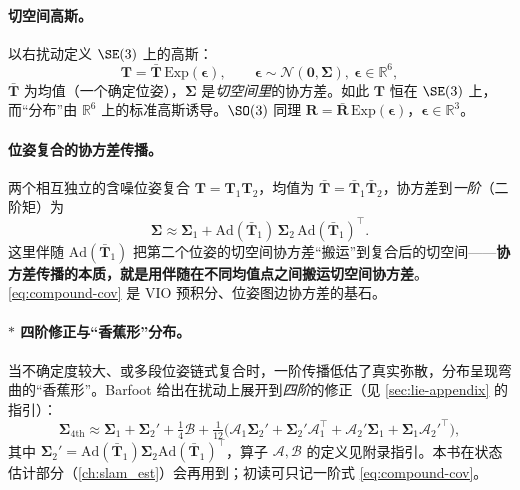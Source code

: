 \paragraph{切空间高斯。}以右扰动定义 $\SE(3)$ 上的高斯：
\begin{equation}
  \mathbf{T}=\bar{\mathbf{T}}\,\mathrm{Exp}(\boldsymbol{\epsilon}),\qquad \boldsymbol{\epsilon}\sim\mathcal{N}(\mathbf{0},\boldsymbol{\Sigma}),\ \boldsymbol{\epsilon}\in\mathbb{R}^6,
  \label{eq:lie-gaussian}
\end{equation}
$\bar{\mathbf{T}}$ 为均值（一个确定位姿），$\boldsymbol{\Sigma}$ 是\emph{切空间里}的协方差。如此 $\mathbf{T}$ 恒在 $\SE(3)$ 上，而“分布”由 $\mathbb{R}^6$ 上的标准高斯诱导。$\SO(3)$ 同理 $\mathbf{R}=\bar{\mathbf{R}}\,\mathrm{Exp}(\boldsymbol{\epsilon})$，$\boldsymbol{\epsilon}\in\mathbb{R}^3$。

\paragraph{位姿复合的协方差传播。}两个相互独立的含噪位姿复合 $\mathbf{T}=\mathbf{T}_1\mathbf{T}_2$，均值为 $\bar{\mathbf{T}}=\bar{\mathbf{T}}_1\bar{\mathbf{T}}_2$，协方差到\emph{一阶}（二阶矩）为
\begin{equation}
  \boldsymbol{\Sigma}\approx\boldsymbol{\Sigma}_1+\mathrm{Ad}(\bar{\mathbf{T}}_1)\,\boldsymbol{\Sigma}_2\,\mathrm{Ad}(\bar{\mathbf{T}}_1)^\top.
  \label{eq:compound-cov}
\end{equation}
这里伴随 $\mathrm{Ad}(\bar{\mathbf{T}}_1)$ 把第二个位姿的切空间协方差“搬运”到复合后的切空间——\textbf{协方差传播的本质，就是用伴随在不同均值点之间搬运切空间协方差}。\cref{eq:compound-cov} 是 VIO 预积分、位姿图边协方差的基石。

\paragraph{$*$ 四阶修正与“香蕉形”分布。}当不确定度较大、或多段位姿链式复合时，一阶传播低估了真实弥散，分布呈现弯曲的“香蕉形”。Barfoot 给出在扰动上展开到\emph{四阶}的修正（见 \cref{sec:lie-appendix} 的指引）：
\begin{equation}
  \boldsymbol{\Sigma}_{4\text{th}}\approx\boldsymbol{\Sigma}_1+\boldsymbol{\Sigma}_2'+\tfrac14\boldsymbol{\mathcal{B}}+\tfrac{1}{12}\big(\boldsymbol{\mathcal{A}}_1\boldsymbol{\Sigma}_2'+\boldsymbol{\Sigma}_2'\boldsymbol{\mathcal{A}}_1^\top+\boldsymbol{\mathcal{A}}_2'\boldsymbol{\Sigma}_1+\boldsymbol{\Sigma}_1\boldsymbol{\mathcal{A}}_2'^\top\big),
  \label{eq:fourth-order}
\end{equation}
其中 $\boldsymbol{\Sigma}_2'=\mathrm{Ad}(\bar{\mathbf{T}}_1)\boldsymbol{\Sigma}_2\mathrm{Ad}(\bar{\mathbf{T}}_1)^\top$，算子 $\boldsymbol{\mathcal{A}},\boldsymbol{\mathcal{B}}$ 的定义见附录指引。本书在状态估计部分（\cref{ch:slam_est}）会再用到；初读可只记一阶式 \cref{eq:compound-cov}。

